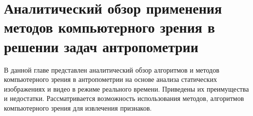 \chapter{Аналитический обзор применения методов компьютерного зрения в решении задач антропометрии} \label{chapt1_intro}

В данной главе представлен аналитический обзор алгоритмов и методов компьютерного зрения в антропометрии на основе анализа статических изображениях и видео в режиме реального времени. Приведены их преимущества и недостатки. Рассматривается возможность использования методов, алгоритмов компьютерного зрения для извлечения признаков.




















